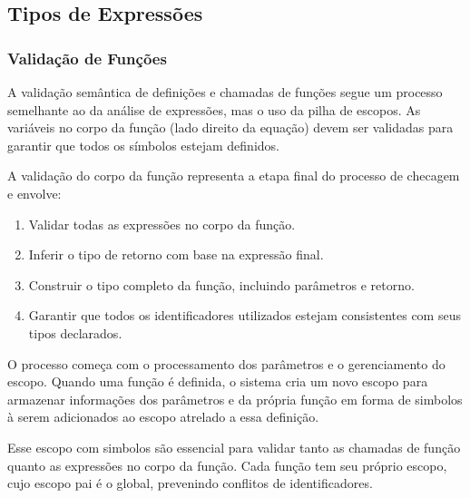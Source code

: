 


\subsection{Tipos de Expressões}

\subsubsection{Validação de Funções}
A validação semântica de definições e chamadas de funções segue um processo semelhante ao da análise de expressões, mas o uso da pilha de escopos. As variáveis no corpo da função (lado direito da equação) devem ser validadas para garantir que todos os símbolos estejam definidos.

A validação do corpo da função representa a etapa final do processo de checagem e envolve:

\begin{enumerate}
    \item Validar todas as expressões no corpo da função.
    \item Inferir o tipo de retorno com base na expressão final.
    \item Construir o tipo completo da função, incluindo parâmetros e retorno.
    \item Garantir que todos os identificadores utilizados estejam consistentes com seus tipos declarados.
\end{enumerate}

O processo começa com o processamento dos parâmetros e o gerenciamento do escopo. Quando uma função é definida, o sistema cria um novo escopo para armazenar informações dos parâmetros e da própria função em forma de simbolos à serem adicionados ao escopo atrelado a essa definição.

Esse escopo com simbolos são essencial para validar tanto as chamadas de função quanto as expressões no corpo da função. Cada função tem seu próprio escopo, cujo escopo pai é o global, prevenindo conflitos de identificadores.

